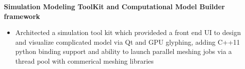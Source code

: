 \begin{cventries}
{\begin{cvitems}
        \item {\fontsize{10pt}{1em}\bodyfont\bfseries\color{darktext}Simulation Modeling ToolKit and Computational Model Builder framework}
          \begin{itemize}
              \item {Architected a simulation tool kit which provideded a front end UI to design and visualize complicated model via Qt and GPU glyphing, adding C++11 python binding support and ability to launch parallel meshing jobs via a thread pool with commerical meshing libraries}
          \end{itemize}
      \end{cvitems}
      \vspace{0.3cm}
    }


\end{cventries}
